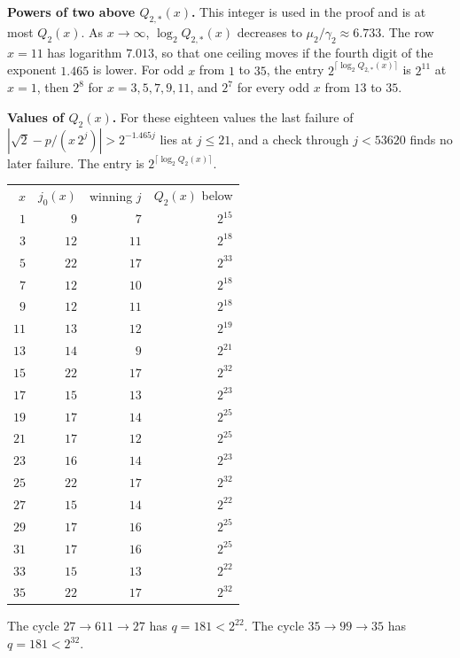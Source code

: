 \documentclass[11pt]{article}
\newcommand{\topic}[1]{\par\noindent\textbf{#1}}
\begin{document}
\topic{Powers of two above $Q_{2,*}(x)$.}
This integer is used in the proof and is at most $Q_2(x)$.
As $x \to \infty$, $\log_2 Q_{2,*}(x)$ decreases to $\mu_2/\gamma_2 \approx 6.733$.
The row $x = 11$ has logarithm $7.013$, so that one ceiling moves if the fourth digit of the exponent $1.465$ is lower.
For odd $x$ from $1$ to $35$, the entry $2^{\lceil \log_2 Q_{2,*}(x) \rceil}$ is $2^{11}$ at $x = 1$, then $2^{8}$ for $x = 3, 5, 7, 9, 11$, and $2^{7}$ for every odd $x$ from $13$ to $35$.

\topic{Values of $Q_2(x)$.}
For these eighteen values the last failure of $|\sqrt{2} - p/(x\, 2^j)| > 2^{-1.465 j}$ lies at $j \le 21$, and a check through $j < 53620$ finds no later failure.
The entry is $2^{\lceil \log_2 Q_2(x) \rceil}$.

\begin{center}
\begin{tabular}{rrrr}
$x$ & $j_0(x)$ & winning $j$ & $Q_2(x)$ below \\
$1$ & $9$ & $7$ & $2^{15}$ \\
$3$ & $12$ & $11$ & $2^{18}$ \\
$5$ & $22$ & $17$ & $2^{33}$ \\
$7$ & $12$ & $10$ & $2^{18}$ \\
$9$ & $12$ & $11$ & $2^{18}$ \\
$11$ & $13$ & $12$ & $2^{19}$ \\
$13$ & $14$ & $9$ & $2^{21}$ \\
$15$ & $22$ & $17$ & $2^{32}$ \\
$17$ & $15$ & $13$ & $2^{23}$ \\
$19$ & $17$ & $14$ & $2^{25}$ \\
$21$ & $17$ & $12$ & $2^{25}$ \\
$23$ & $16$ & $14$ & $2^{23}$ \\
$25$ & $22$ & $17$ & $2^{32}$ \\
$27$ & $15$ & $14$ & $2^{22}$ \\
$29$ & $17$ & $16$ & $2^{25}$ \\
$31$ & $17$ & $16$ & $2^{25}$ \\
$33$ & $15$ & $13$ & $2^{22}$ \\
$35$ & $22$ & $17$ & $2^{32}$ \\
\end{tabular}
\end{center}

The cycle $27 \to 611 \to 27$ has $q = 181 < 2^{22}$.
The cycle $35 \to 99 \to 35$ has $q = 181 < 2^{32}$.
\end{document}
